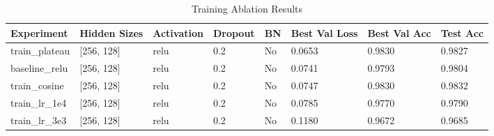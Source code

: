 \begin{table}[t]
    \centering
    \caption{Training Ablation Results}
    \label{tab:training_ablation}
    \begin{tabular}{llllllll}
        \toprule
        Experiment & Hidden Sizes & Activation & Dropout & BN & Best Val Loss & Best Val Acc & Test Acc \\
        \midrule
        train_plateau & [256, 128] & relu & 0.2 & No & 0.0653 & 0.9830 & 0.9827 \\
        baseline_relu & [256, 128] & relu & 0.2 & No & 0.0741 & 0.9793 & 0.9804 \\
        train_cosine & [256, 128] & relu & 0.2 & No & 0.0747 & 0.9830 & 0.9832 \\
        train_lr_1e4 & [256, 128] & relu & 0.2 & No & 0.0785 & 0.9770 & 0.9790 \\
        train_lr_3e3 & [256, 128] & relu & 0.2 & No & 0.1180 & 0.9672 & 0.9685 \\
        \bottomrule
    \end{tabular}
\end{table}